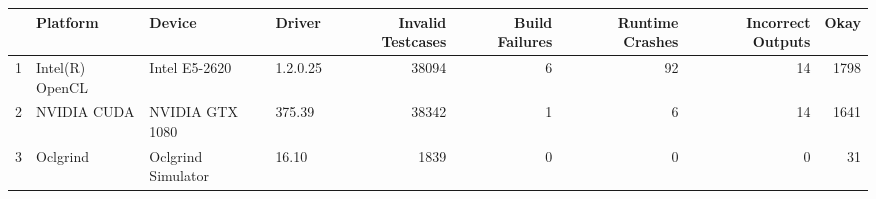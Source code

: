 \begin{tabular}{llllrrrrr}
\toprule
{} &         Platform &              Device &    Driver &  Invalid Testcases &  Build Failures &  Runtime Crashes &  Incorrect Outputs &  Okay \\
\midrule
1 &  Intel(R) OpenCL &       Intel E5-2620 &  1.2.0.25 &              38094 &               6 &               92 &                 14 &  1798 \\
2 &      NVIDIA CUDA &     NVIDIA GTX 1080 &    375.39 &              38342 &               1 &                6 &                 14 &  1641 \\
3 &         Oclgrind &  Oclgrind Simulator &     16.10 &               1839 &               0 &                0 &                  0 &    31 \\
\bottomrule
\end{tabular}
